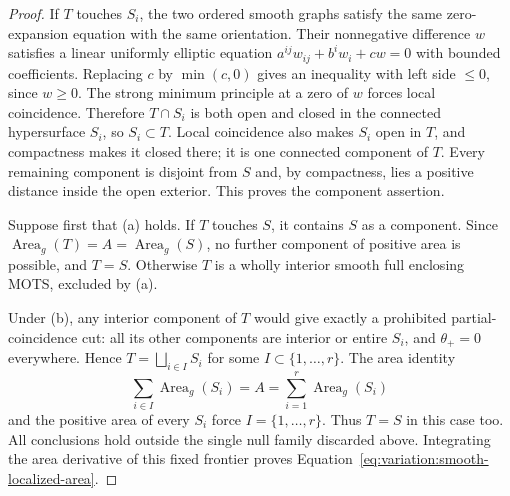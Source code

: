 \begin{proof}
If $T$ touches $S_i$, the two ordered smooth graphs satisfy the same
zero-expansion equation with the same orientation. Their nonnegative
difference $w$ satisfies a linear uniformly elliptic equation
$a^{ij}w_{ij}+b^i w_i+cw=0$ with bounded coefficients. Replacing $c$
by $\min(c,0)$ gives an inequality with left side $\le0$, since
$w\ge0$. The strong minimum principle at a zero of $w$ forces local
coincidence. Therefore $T\cap S_i$ is both open and closed in the
connected hypersurface $S_i$, so $S_i\subset T$. Local coincidence
also makes $S_i$ open in $T$, and compactness makes it closed there;
it is one connected component of $T$. Every remaining component is
disjoint from $S$ and, by compactness, lies a positive distance inside
the open exterior. This proves the component assertion.

Suppose first that \textup{(a)} holds. If $T$ touches $S$, it contains
$S$ as a component. Since $\operatorname{Area}_g(T)=A=
\operatorname{Area}_g(S)$, no further component of positive area is
possible, and $T=S$. Otherwise $T$ is a wholly interior smooth full
enclosing MOTS, excluded by \textup{(a)}.

Under \textup{(b)}, any interior component of $T$ would give exactly
a prohibited partial-coincidence cut: all its other components are
interior or entire $S_i$, and $\theta_+=0$ everywhere. Hence
$T=\bigsqcup_{i\in I}S_i$ for some $I\subset\{1,\ldots,r\}$.
The area identity
\[
 \sum_{i\in I}\operatorname{Area}_g(S_i)
       =A=\sum_{i=1}^r\operatorname{Area}_g(S_i)
\]
and the positive area of every $S_i$ force $I=\{1,\ldots,r\}$.
Thus $T=S$ in this case too. All conclusions hold outside the single
null family discarded above. Integrating the area derivative of this
fixed frontier proves Equation~\eqref{eq:variation:smooth-localized-area}.
\end{proof}
